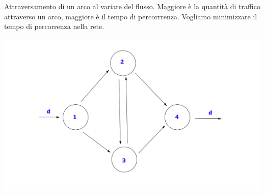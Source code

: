 \begin{example}

Attraversamento di un arco al variare del flusso.
Maggiore \`e la quantit\`a di traffico attraverso un arco, maggiore \`e il tempo
di percorrrenza. Vogliamo minimizzare il tempo di percorrenza nella rete.

\begin{center}
  \includegraphics[scale=0.6]{imgs/traffico.png}
\end{center}


\end{example}

